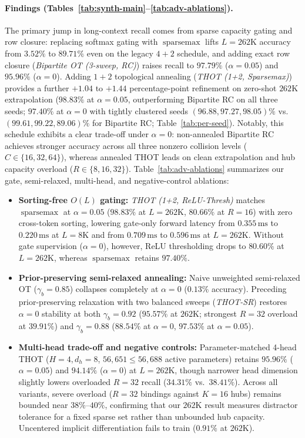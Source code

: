 \documentclass[11pt]{article}
\newcommand{\sparsemax}{\operatorname{sparsemax}}
\begin{document}
\paragraph{Findings (Tables~\ref{tab:synth-main}--\ref{tab:adv-ablations}).}
The primary jump in long-context recall comes from sparse capacity gating and row closure: replacing softmax gating with $\sparsemax$ lifts $L=262\text{K}$ accuracy from $3.52\%$ to $89.71\%$ even on the legacy $4+2$ schedule, and adding exact row closure (\emph{Bipartite OT (3-sweep, RC)}) raises recall to $97.79\%$ ($\alpha=0.05$) and $95.96\%$ ($\alpha=0$). Adding $1+2$ topological annealing (\emph{THOT (1+2, Sparsemax)}) provides a further $+1.04$ to $+1.44$ percentage-point refinement on zero-shot $262\text{K}$ extrapolation ($98.83\%$ at $\alpha=0.05$, outperforming Bipartite RC on all three seeds; $97.40\%$ at $\alpha=0$ with tightly clustered seeds $(96.88, 97.27, 98.05)\%$ vs.\ $(99.61, 99.22, 89.06)\%$ for Bipartite RC; Table~\ref{tab:per-seed}). Notably, this schedule exhibits a clear trade-off under $\alpha=0$: non-annealed Bipartite RC achieves stronger accuracy across all three nonzero collision levels ($C \in \{16, 32, 64\}$), whereas annealed THOT leads on clean extrapolation and hub capacity overload ($R \in \{8, 16, 32\}$). Table~\ref{tab:adv-ablations} summarizes our gate, semi-relaxed, multi-head, and negative-control ablations:
\begin{itemize}[leftmargin=1.5em]
  \item \textbf{Sorting-free $O(L)$ gating:} \emph{THOT (1+2, ReLU-Thresh)} matches $\sparsemax$ at $\alpha=0.05$ ($98.83\%$ at $L=262\text{K}$, $80.66\%$ at $R=16$) with zero cross-token sorting, lowering gate-only forward latency from $0.355\,\text{ms}$ to $0.220\,\text{ms}$ at $L=8\text{K}$ and from $0.709\,\text{ms}$ to $0.596\,\text{ms}$ at $L=262\text{K}$. Without gate supervision ($\alpha=0$), however, ReLU thresholding drops to $80.60\%$ at $L=262\text{K}$, whereas $\sparsemax$ retains $97.40\%$.
  \item \textbf{Prior-preserving semi-relaxed annealing:} Naive unweighted semi-relaxed OT ($\gamma_b=0.85$) collapses completely at $\alpha=0$ ($0.13\%$ accuracy). Preceding prior-preserving relaxation with two balanced sweeps (\emph{THOT-SR}) restores $\alpha=0$ stability at both $\gamma_b=0.92$ ($95.57\%$ at $262\text{K}$; strongest $R=32$ overload at $39.91\%$) and $\gamma_b=0.88$ ($88.54\%$ at $\alpha=0$, $97.53\%$ at $\alpha=0.05$).
  \item \textbf{Multi-head trade-off and negative controls:} Parameter-matched 4-head THOT ($H=4, d_h=8$, $56{,}651 \le 56{,}688$ active parameters) retains $95.96\%$ ($\alpha=0.05$) and $94.14\%$ ($\alpha=0$) at $L=262\text{K}$, though narrower head dimension slightly lowers overloaded $R=32$ recall ($34.31\%$ vs.\ $38.41\%$). Across all variants, severe overload ($R=32$ bindings against $K=16$ hubs) remains bounded near $38\%$--$40\%$, confirming that our $262\text{K}$ result measures distractor tolerance for a fixed sparse set rather than unbounded hub capacity. Uncentered implicit differentiation fails to train ($0.91\%$ at $262\text{K}$).
\end{itemize}
\end{document}
